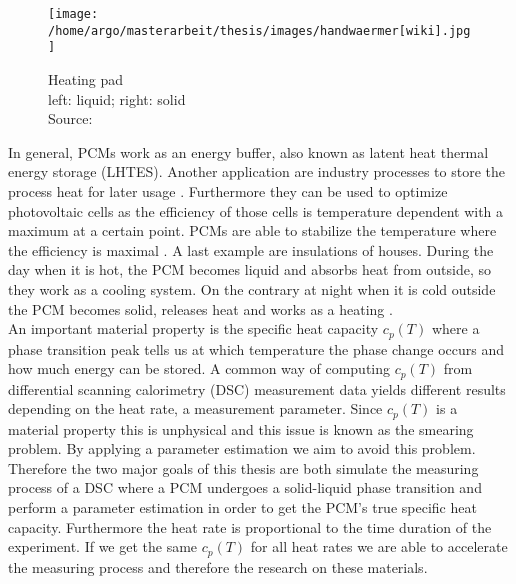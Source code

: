 \documentclass{scrartcl}[12pt, halfparskip]
\numberwithin{equation}{section}
\numberwithin{figure}{section}
\numberwithin{table}{section}
\begin{document}
\begin{wrapfigure}{l}{0.4\textwidth}
	\texttt{[image: /home/argo/masterarbeit/thesis/images/handwaermer[wiki].jpg]}
	\caption{Heating pad \\ left: liquid; right: solid \\
		Source: \cite{heating_pad_image}}
	\label{fig:heating_pad}
\end{wrapfigure}


In general, PCMs work as an energy buffer, also known as  latent heat thermal energy storage (LHTES). Another application are industry processes to store the process heat for later usage \cite{pcm_process_heat}. Furthermore they can be used to optimize  photovoltaic cells as the efficiency of those cells is temperature dependent with a maximum at a certain point. PCMs are able to stabilize the temperature where the efficiency is maximal \cite{pcm_solar_cells}. 
A last example are insulations of houses. During the day when it is hot, the PCM becomes liquid and absorbs heat from outside, so they work as a cooling system. On the contrary at night when it is cold outside the PCM becomes solid, releases heat and works as a heating \cite{pcm_house_insulation}. \\
An important material property is the specific heat capacity $c_p(T)$ where a phase transition peak tells us at which temperature the phase change occurs and how much energy can be stored. A common way of computing $c_p(T)$ from differential scanning calorimetry (DSC) measurement data yields different results depending on the heat rate, a measurement parameter. Since $c_p(T)$ is a material property this is unphysical and this issue is known as the smearing problem. By applying a parameter estimation we aim to avoid this problem.
Therefore the two major goals of this thesis are both simulate the measuring process of a DSC where a PCM undergoes a solid-liquid phase transition and perform a parameter estimation in order to get the PCM's true specific heat capacity. 
Furthermore the heat rate is proportional to the time duration of the experiment. If we get the same $c_p(T)$ for all heat rates we are able to accelerate the measuring process and therefore the research on these materials.
\end{document}
